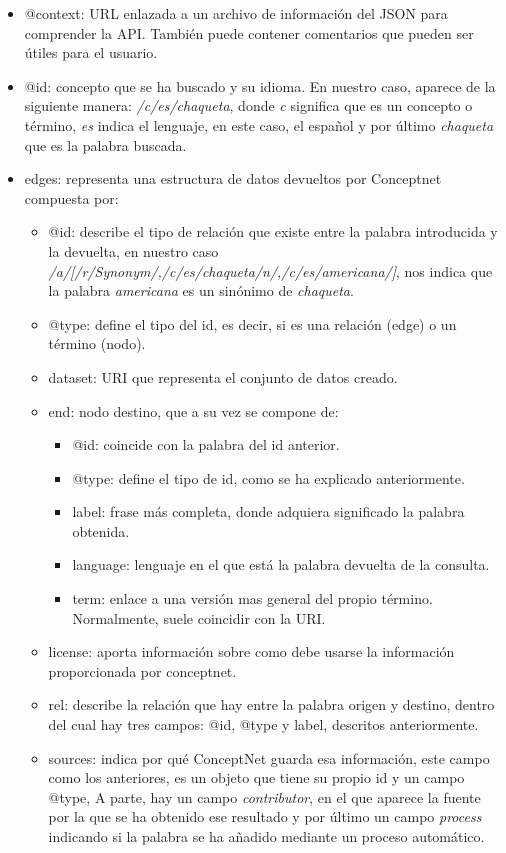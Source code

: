 \begin{itemize}
	\item @context: URL enlazada a un archivo de información del JSON para comprender la API. También puede contener comentarios que pueden ser útiles para el usuario.
	\item @id: concepto que se ha buscado y su idioma. En nuestro caso, aparece de la siguiente manera: \textit{/c/es/chaqueta}, donde  \textit{c} significa que es un concepto o término,  \textit{es} indica el lenguaje, en este caso, el español y por último \textit{chaqueta} que es la palabra buscada.
	\item edges: representa una estructura de datos devueltos por Conceptnet compuesta por:
	\begin{itemize}
		\item @id: describe el tipo de relación que existe entre la palabra introducida y la devuelta, en nuestro caso \textit{/a/[/r/Synonym/,/c/es/chaqueta/n/,/c/es/americana/]}, nos indica que la palabra \textit{americana} es un sinónimo de \textit{chaqueta}.
		\item @type: define el tipo del id, es decir, si es una relación (edge) o un término (nodo).
		\item dataset: URI que representa el conjunto de datos creado.
		\item end: nodo destino, que a su vez se compone de:	
		\begin{itemize}
			\item @id: coincide con la palabra del id anterior.
			\item @type: define el tipo de id, como se ha explicado anteriormente.
			\item label: frase más completa, donde adquiera significado la palabra obtenida.
			\item language: lenguaje en el que está la palabra devuelta de la consulta.
			\item term: enlace a una versión mas general del propio término. Normalmente, suele coincidir con la URI.			
		\end{itemize}
		\item license: aporta información sobre como debe usarse la información proporcionada por conceptnet.
		\item rel: describe la relación que hay entre la palabra origen y destino, dentro del cual hay tres campos: @id, @type y label, descritos anteriormente.
		\item sources: indica por qué ConceptNet guarda esa información, este campo como los anteriores, es un objeto que tiene su propio id y un campo @type, A parte, hay un campo \textit{contributor}, en el que aparece la fuente por la que se ha obtenido ese resultado y por último un campo \textit{process} indicando si la palabra se ha añadido mediante un proceso automático.

\end{itemize}
\end{itemize}

